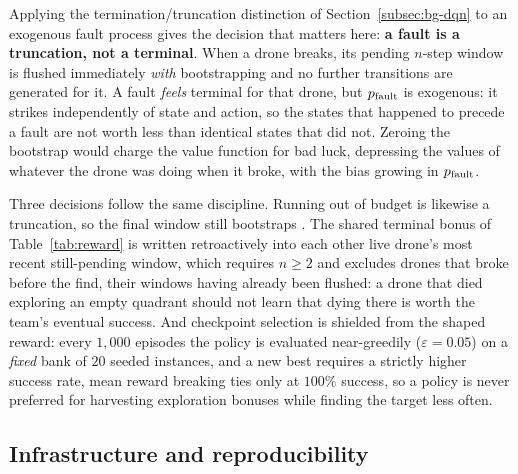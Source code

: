 Applying the termination/truncation distinction of
Section~\ref{subsec:bg-dqn} to an exogenous fault process gives the decision
that matters here: \textbf{a fault is a truncation, not a terminal}. When a drone
breaks, its pending $n$-step window is flushed immediately \emph{with}
bootstrapping and no further transitions are generated for it. A fault
\emph{feels} terminal for that drone, but $p_{\mathrm{fault}}$ is exogenous: it strikes
independently of state and action, so the states that happened to precede a fault
are not worth less than identical states that did not. Zeroing the bootstrap
would charge the value function for bad luck, depressing the values of whatever
the drone was doing when it broke, with the bias growing in $p_{\mathrm{fault}}$.

Three decisions follow the same discipline. Running out of budget is likewise a
truncation, so the final window still bootstraps \citep{pardo2018time}. The
shared terminal bonus of Table~\ref{tab:reward} is written retroactively into
each other live drone's most recent still-pending window, which requires
$n \geq 2$ and excludes drones that broke before the find, their windows having
already been flushed: a drone that died exploring an empty quadrant should not
learn that dying there is worth the team's eventual success. And checkpoint
selection is shielded from the shaped reward: every $1{,}000$ episodes the policy
is evaluated near-greedily ($\varepsilon = 0.05$) on a \emph{fixed} bank of $20$
seeded instances, and a new best requires a strictly higher success rate, mean
reward breaking ties only at $100\%$ success, so a policy is never preferred for
harvesting exploration bonuses while finding the target less often.

\subsection{Infrastructure and reproducibility}
\label{subsec:train-infra}

